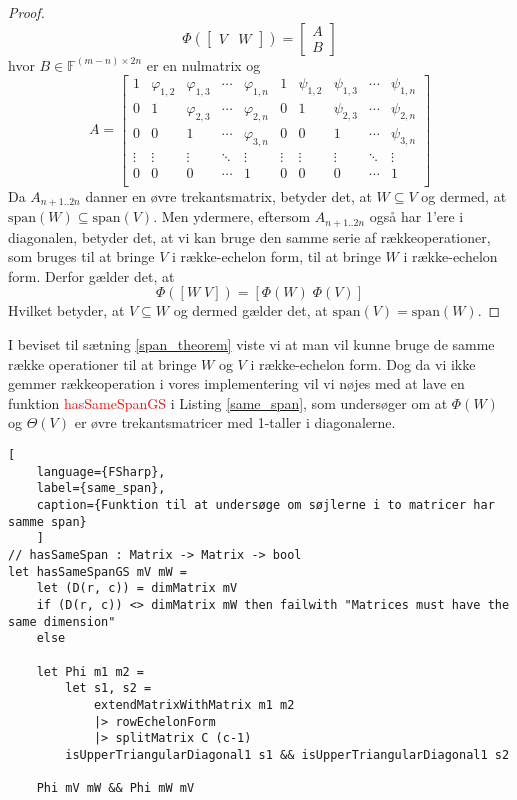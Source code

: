 \begin{proof}
    \[
    \Phi\left( \begin{bmatrix} V & W \end{bmatrix} \right) = 
        \begin{bmatrix}
            A \\ 
            B
        \end{bmatrix}
    \]
    hvor \(B \in \mathbb{F}^{(m-n) \times 2n}\) er en nulmatrix og 
    \[ A = 
    \begin{bmatrix}
        1 & \varphi_{1,2} & \varphi_{1,3} & \cdots & \varphi_{1,n} & 1 & \psi_{1,2} & \psi_{1,3} & \cdots & \psi_{1,n} \\
        0 & 1 & \varphi_{2,3} & \cdots & \varphi_{2,n} & 0 & 1 & \psi_{2,3} & \cdots & \psi_{2,n} \\
        0 & 0 & 1 & \cdots & \varphi_{3,n} & 0 & 0 & 1 & \cdots & \psi_{3,n} \\
        \vdots & \vdots & \vdots & \ddots & \vdots & \vdots & \vdots & \vdots & \ddots & \vdots \\
        0 & 0 & 0 & \cdots & 1 & 0 & 0 & 0 & \cdots & 1 \\ 
    \end{bmatrix}
    \]
    Da \(A_{n+1..2n}\) danner en øvre trekantsmatrix, betyder det, at \( W \subseteq V\) og dermed, at \(\text{span}(W) \subseteq \text{span}(V)\). Men ydermere, eftersom \(A_{n+1..2n}\) også har 1'ere i diagonalen, betyder det, at vi kan bruge den samme serie af rækkeoperationer, som bruges til at bringe \(V\) i række-echelon form, til at bringe \(W\) i række-echelon form. Derfor gælder det, at
    \[
    \Phi([W \; V]) = [\Phi(W) \; \Phi(V)]   
    \]
    Hvilket betyder, at \(V \subseteq W\) og dermed gælder det, at \(\text{span}(V) = \text{span}(W)\).   
\end{proof}


I beviset til sætning \ref{span_theorem} viste vi at man vil kunne bruge de samme række operationer til at bringe \(W\) og \(V\) i række-echelon form. Dog da vi ikke gemmer rækkeoperation i vores implementering vil vi nøjes med at lave en funktion \textcolor{red}{hasSameSpanGS} i Listing \ref{same_span}, som undersøger om at \(\Phi(W)\) og \(\Theta(V)\) er øvre trekantsmatricer med 1-taller i diagonalerne. 

\begin{lstlisting}[
    language={FSharp}, 
    label={same_span},
    caption={Funktion til at undersøge om søjlerne i to matricer har samme span}
    ]
// hasSameSpan : Matrix -> Matrix -> bool
let hasSameSpanGS mV mW = 
    let (D(r, c)) = dimMatrix mV
    if (D(r, c)) <> dimMatrix mW then failwith "Matrices must have the same dimension"
    else
    
    let Phi m1 m2 = 
        let s1, s2 = 
            extendMatrixWithMatrix m1 m2 
            |> rowEchelonForm 
            |> splitMatrix C (c-1)
        isUpperTriangularDiagonal1 s1 && isUpperTriangularDiagonal1 s2

    Phi mV mW && Phi mW mV
\end{lstlisting}

